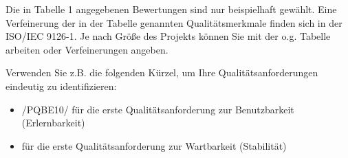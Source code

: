 Die in Tabelle 1 angegebenen Bewertungen sind nur beispielhaft gewählt.
Eine Verfeinerung der in der Tabelle genannten Qualitätsmerkmale finden sich in der ISO/IEC 9126-1. Je nach Größe des Projekts können Sie mit der o.g. Tabelle arbeiten oder Verfeinerungen angeben.

Verwenden Sie z.B. die folgenden Kürzel, um Ihre Qualitätsanforderungen eindeutig zu identifizieren:
\begin{itemize}
	\item /PQBE10/ für die erste Qualitätsanforderung zur Benutzbarkeit (Erlernbarkeit)
	\item[]für die erste Qualitätsanforderung zur Wartbarkeit (Stabilität)
\end{itemize}
